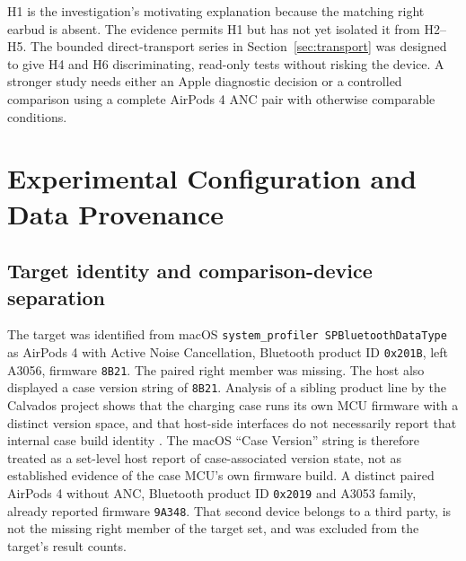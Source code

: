 \documentclass[11pt,letterpaper]{article}
\begin{document}
H1 is the investigation's motivating explanation because the matching right earbud is absent. The evidence permits H1 but has not yet isolated it from H2--H5. The bounded direct-transport series in Section~\ref{sec:transport} was designed to give H4 and H6 discriminating, read-only tests without risking the device. A stronger study needs either an Apple diagnostic decision or a controlled comparison using a complete AirPods 4 ANC pair with otherwise comparable conditions.

\section{Experimental Configuration and Data Provenance}\label{sec:setup}
\subsection{Target identity and comparison-device separation}
The target was identified from macOS \texttt{system\_profiler SPBluetoothDataType} as AirPods 4 with Active Noise Cancellation, Bluetooth product ID \texttt{0x201B}, left A3056, firmware \texttt{8B21}. The paired right member was missing. The host also displayed a case version string of \texttt{8B21}. Analysis of a sibling product line by the Calvados project shows that the charging case runs its own MCU firmware with a distinct version space, and that host-side interfaces do not necessarily report that internal case build identity \cite{calvados}. The macOS ``Case Version'' string is therefore treated as a set-level host report of case-associated version state, not as established evidence of the case MCU's own firmware build. A distinct paired AirPods 4 without ANC, Bluetooth product ID \texttt{0x2019} and A3053 family, already reported firmware \texttt{9A348}. That second device belongs to a third party, is not the missing right member of the target set, and was excluded from the target's result counts.
\end{document}
